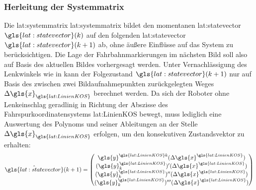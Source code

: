 \subsubsection{Herleitung der Systemmatrix}
Die \glsdesc{lat:systemmatrix} \gls{lat:systemmatrix} bildet den momentanen \glsdesc{lat:statevector} \(\gls{lat:statevector}(\scl{k})\) auf den folgenden \glsdesc{lat:statevector} \(\gls{lat:statevector}(\scl{k}+1)\) ab, ohne äußere Einflüsse auf das System zu berücksichtigen. Die Lage der Fahrbahnmarkierungen im nächsten Bild soll also auf Basis des aktuellen Bildes vorhergesagt werden.
Unter Vernachlässigung des Lenkwinkels wie in \autocite[48]{petersfalkoFPGAbasierteBildverarbeitungspipelineZur2009} kann der Folgezustand  \(\gls{lat:statevector}(\scl{k}+1)\) nur auf Basis des zwischen zwei Bildaufnahmepunkten zurückgelegten Weges \(\scl{\Delta\gls{x}}_{\gls{lat:LinienKOS}}\) berechnet werden. Da sich der Roboter ohne Lenkeinschlag geradlinig in Richtung der Abszisse des Fahrspurkoordinatensystems \gls{lat:LinienKOS} bewegt, muss lediglich eine Auswertung des Polynoms und seiner Ableitungen an der Stelle \(\scl{\Delta\gls{x}}_{\gls{lat:LinienKOS}}\) erfolgen, um den konsekutiven Zustandsvektor zu erhalten:
\begin{equation}
\label{eq:nextstatemapping}
\hat{\gls{lat:statevector}}(\scl{k}+1) =
\begin{pmatrix}
\gls{y}^{\gls{lat:LinienKOS}\scl{k}}(\scl{\Delta\gls{x}}^{\gls{lat:LinienKOS}}) \\
\der{(\gls{y}^{\gls{lat:LinienKOS}}_{\scl{k}})}(\scl{\Delta\gls{x}}^{\gls{lat:LinienKOS}}) \\
\derII{(\gls{y}^{\gls{lat:LinienKOS}}_{\scl{k}})}(\scl{\Delta\gls{x}}^{\gls{lat:LinienKOS}}) \\
\derIII{(\gls{y}^{\gls{lat:LinienKOS}}_{\scl{k}})}(\scl{\Delta\gls{x}}^{\gls{lat:LinienKOS}}) \\
\end{pmatrix}
\end{equation}

